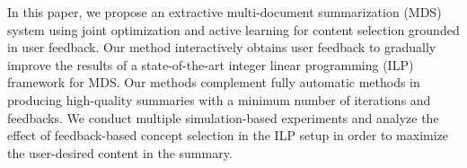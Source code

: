 In this paper, we propose an extractive multi-document summarization (MDS) system using joint optimization and active learning for content selection grounded in user feedback. Our method interactively obtains user feedback to gradually improve the results of a state-of-the-art integer linear programming (ILP) framework for MDS. Our methods complement fully automatic methods in producing high-quality summaries with a minimum number of iterations and feedbacks. We conduct multiple simulation-based experiments and analyze the effect of feedback-based concept selection in the ILP setup in order to maximize the user-desired content in the summary.
